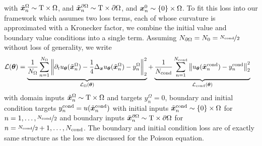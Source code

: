 with $\tilde{{\bm{x}}}_n^{\Omega} \sim \mathrm{T} \times \Omega$, and $\tilde{{\bm{x}}}_n^{\partial\Omega} \sim \mathrm{T} \times \partial\Omega$, and ${\bm{x}}_n^0 \sim \{0\} \times \Omega$.
To fit this loss into our framework which assumes two loss terms, each of whose curvature is approximated with a Kronecker factor, we combine the initial value and boundary value conditions into a single term.
Assuming $N_{\partial \Omega} = N_0 = \nicefrac{N_{\text{cond}}}{2}$ without loss of generality, we write
\begin{align*}
  {\mathcal{L}}({\bm{\theta}})
  &=
    \underbrace{
    \frac{1}{N_{\Omega}}
    \sum_{n=1}^{N_{\Omega}}
    \left\lVert
    \partial_t u_{{\bm{\theta}}}(\tilde{{\bm{x}}}_n^{\Omega})
    -
    \frac{1}{4} \Delta_{{\bm{x}}} u_{{\bm{\theta}}}(\tilde{{\bm{x}}}_n^{\Omega})
    - y_n^{\Omega}
    \right\rVert^2_2
    }_{{\mathcal{L}}_{\Omega}({\bm{\theta}})}
  +
    \underbrace{
    \frac{1}{N_{\text{cond}}}
    \sum_{n=1}^{N_{\text{cond}}}
    \left\lVert
    u_{{\bm{\theta}}}(\tilde{{\bm{x}}}_n^{\text{cond}})
    -
    y_n^{\text{cond}}
    \right\rVert^2_2
    }_{{\mathcal{L}}_{\text{cond}}({\bm{\theta}})}
\end{align*}
with domain inputs $\tilde{{\bm{x}}}_n^{\Omega} \sim \mathrm{T} \times \Omega$ and targets $y_n^{\Omega} = 0$, boundary and initial condition targets $y_n^{\text{cond}} = u(\tilde{{\bm{x}}}_n^{\text{cond}})$ with initial inputs $\tilde{{\bm{x}}}_n^{\text{cond}} \sim \{0\} \times \Omega$ for $n = 1, \dots, \nicefrac{N_{\text{cond}}}{2}$ and boundary inputs $\tilde{{\bm{x}}}_n^{\partial\Omega} \sim \mathrm{T} \times \partial\Omega$ for $n = \nicefrac{N_{\text{cond}}}{2}+1, \dots, N_{\text{cond}}$.
The boundary and initial condition loss are of exactly same structure as the loss we discussed for the Poisson equation.

